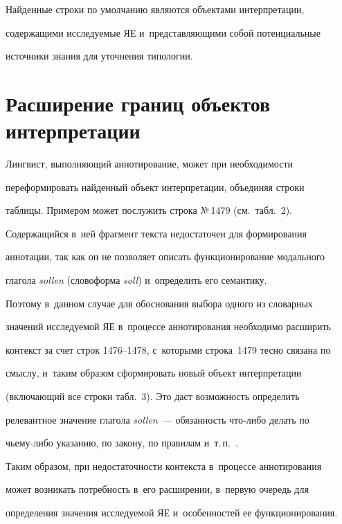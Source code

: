   


  Найденные строки по умолчанию являются объектами интерпретации, 


содержащими исследуемые ЯЕ и~представляющими собой потенциальные 


источники знания для уточнения типологии.


  


\section{Расширение границ объектов интерпретации}





  Лингвист, выполняющий аннотирование, может при необходимости 


переформировать найденный объект интерпретации, объединяя строки 


таблицы. Примером может послужить строка №\,1479 (см.\ табл.~2). 


Содержащийся в~ней фрагмент текста недостаточен для формирования 


аннотации, так как он не позволяет описать функционирование модального 


глагола \textit{sollen} (словоформа \textit{soll}) и~определить его семантику. 


Поэтому в~данном случае для обоснования выбора одного из словарных 


значений исследуемой ЯЕ в~процессе аннотирования необходимо расширить 


контекст за счет строк 1476--1478, с~которыми строка~1479 тесно связана по 


смыслу, и~таким образом сформировать новый объект интерпретации 


(включающий все строки табл.~3). Это даст возможность определить 


релевантное значение глагола \textit{sollen}~--- обязанность что-либо делать по 


чьему-либо указанию, по закону, по правилам и~т.\,п.~\cite{8-gz}.


  


  Таким образом, при недостаточности контекста в~процессе аннотирования 


может возникать потребность в~его расширении, в~первую очередь для 


определения значения исследуемой ЯЕ и~особенностей ее функционирования. 


